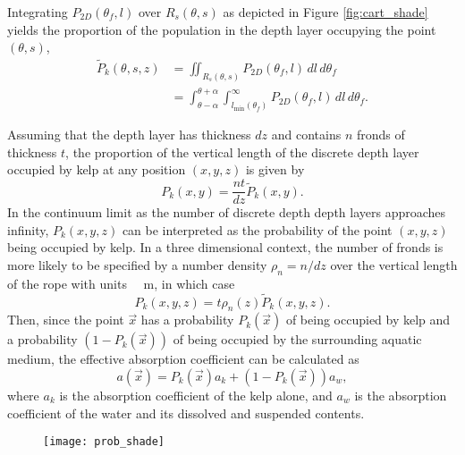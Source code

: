 Integrating $P_{2D}(\theta_f,l)$ over $R_s(\theta,s)$ as depicted in Figure \ref{fig:cart_shade} yields the proportion of the population in the depth layer occupying the point $(\theta,s)$,
\begin{align*}
		\tilde{P}_k(\theta,s,z)	&= \iint_{R_s(\theta,s)}
								P_{2D}(\theta_f,l)
								\,dl\,d\theta_f \nonumber \\
							&= \int_{\theta-\alpha}^{\theta+\alpha}
								\int_{l_{\min}(\theta_f)}^\infty
								P_{2D}(\theta_f,l)
								\,dl\,d\theta_f.
\end{align*}

Assuming that the depth layer has thickness $dz$ and contains $n$ fronds of thickness $t$,
the proportion of the vertical length of the discrete depth layer occupied by kelp at any position $(x,y,z)$ is given by
\begin{equation*}
  P_k(x, y) = \frac{nt}{dz}\tilde{P}_k(x, y).
\end{equation*}
In the continuum limit as the number of discrete depth depth layers approaches infinity, $P_k(x,y,z)$ can be interpreted as the probability of the point $(x,y,z)$ being occupied by kelp.
In a three dimensional context, the number of fronds is more likely to be specified by a number density $\rho_n=n/dz$ over the vertical length of the rope with units \SI{}{\per\m}, in which case
\begin{equation*}
  P_k(x, y, z) = t \rho_n(z) \tilde{P}_k(x, y, z).
\end{equation*}
Then, since the point $\vec{x}$ has a probability $P_k(\vec{x})$ of being occupied by kelp and a probability $(1-P_k(\vec{x}))$ of being occupied by the surrounding aquatic medium,
the effective absorption coefficient can be calculated as
\begin{equation*}
  \label{eqn:abs_field}
  a(\vec{x}) = P_k(\vec{x})a_k + (1-P_k(\vec{x}))a_w,
\end{equation*}
where $a_k$ is the absorption coefficient of the kelp alone, and $a_w$ is the absorption coefficient of the water and its dissolved and suspended contents.

\begin{figure}[h]
	\centering
	\texttt{[image: prob\_shade]}
	\label{fig:prob_shade}
\end{figure}

